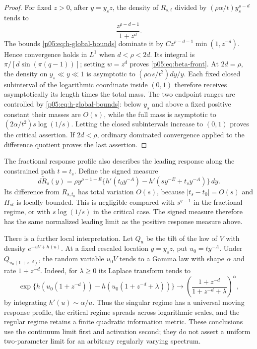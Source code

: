 \documentclass[11pt,letterpaper]{article}
\theoremstyle{definition}
\theoremstyle{remark}
\newcommand{\1}{\mathbf 1}
\begin{document}
\begin{proof}
For fixed $z>0$, after $y=y_sz$, the density of $R_{s,t}$ divided by
$(\rho\alpha/t)y_s^{\rho-d}$ tends to
\[
 \frac{z^{\rho-d-1}}{1+z^d}.
\]
The bounds \eqref{p05:eq:h-global-bounds} dominate it by
$Cz^{\rho-d-1}\min(1,z^{-d})$. Hence convergence holds in
$L^1$ when $d<\rho<2d$. Its integral is
$\pi/[d\sin(\pi(q-1))]$; setting $w=z^d$ proves
\eqref{p05:eq:beta-front}.
At $2d=\rho$, the density on $y_s\ll y\ll1$ is
asymptotic to $(\rho\alpha s/t^2)dy/y$.
Each fixed closed subinterval of the logarithmic coordinate
inside $(0,1)$ therefore receives asymptotically its length times
the total mass. The two endpoint ranges are controlled by
\eqref{p05:eq:h-global-bounds}: below $y_s$ and above a fixed positive
constant their masses are $O(s)$, while the full mass is
asymptotic to $(2\alpha/t^2)s\log(1/s)$.
Letting the closed subintervals increase to $(0,1)$ proves the
critical assertion. If $2d<\rho$, ordinary dominated convergence
applied to the difference quotient proves the last assertion.
\end{proof}

The fractional response profile also describes the leading response
along the constrained path $t=t_s$. Define the signed measure
\[
 d\widetilde R_s(y)=\rho y^{\rho-1-E}
 \{h'(t_0y^{-A})-h'(sy^{-E}+t_sy^{-A})\}\,dy.
\]
Its difference from $R_{s,t_0}$ has total variation $O(s)$,
because $|t_s-t_0|=O(s)$ and $H_{st}$ is locally bounded.
This is negligible compared with $s^{q-1}$ in the fractional regime,
or with $s\log(1/s)$ in the critical case. The signed measure
therefore has the same normalized leading limit as the positive
response measure above.

There is a further local interpretation. Let $Q_u$ be the tilt of
the law of $V$ with density $e^{-uV+h(u)}$. At a fixed rescaled
location $y=y_sz$, put $u_0=ty^{-A}$. Under
$Q_{u_0(1+z^{-d})}$, the random variable $u_0V$ tends to a Gamma
law with shape $\alpha$ and rate $1+z^{-d}$. Indeed, for $\lambda\ge0$
its Laplace transform tends to
\[
 \exp\{h(u_0(1+z^{-d}))-h(u_0(1+z^{-d}+\lambda))\}
 \longrightarrow
 \left(\frac{1+z^{-d}}{1+z^{-d}+\lambda}\right)^\alpha,
\]
by integrating $h'(u)\sim\alpha/u$.
Thus the singular regime has a universal moving response profile,
the critical regime spreads across logarithmic scales, and the
regular regime retains a finite quadratic information metric.
These conclusions use the continuum limit first and activation
second; they do not assert a uniform two-parameter limit for an
arbitrary regularly varying spectrum.
\end{document}

